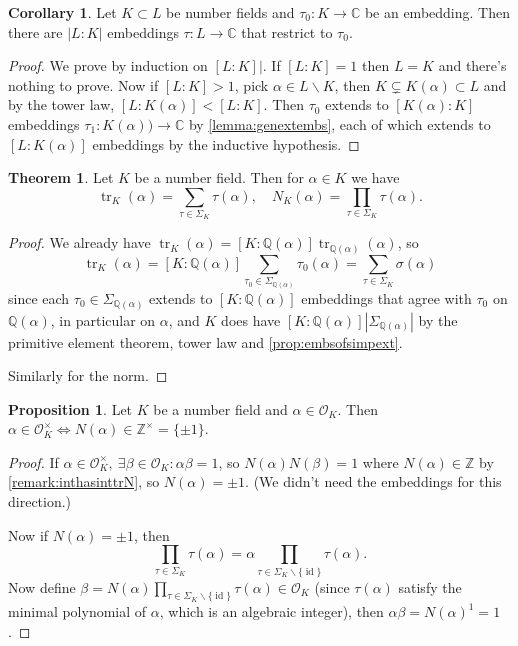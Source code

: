 \documentclass{article}
\newcommand{\Z}{\mathbb{Z}}
\newcommand{\Q}{\mathbb{Q}}
\newcommand{\C}{\mathbb{C}}
\newcommand{\id}{\operatorname{id}}
\newcommand{\tr}{\operatorname{tr}}
\newcommand{\ri}{\mathcal{O}}
\theoremstyle{definition}
\newtheorem{prop}[defn]{Proposition}
\newtheorem{thm}[defn]{Theorem}
\newtheorem{coro}[defn]{Corollary}
\begin{document}
\begin{coro}
Let $K\subset L$ be number fields and $\tau_0:K\rightarrow\C$ be an embedding. Then there are $|L:K|$ embeddings $\tau:L\rightarrow\C$ that restrict to $\tau_0$.
\end{coro}
\begin{proof}
We prove by induction on $[L:K]|$. If $[L:K]=1$ then $L=K$ and there's nothing to prove. Now if $[L:K]>1$, pick $\alpha\in L\backslash K$, then $K\subsetneq K(\alpha)\subset L$ and by the tower law, $[L:K(\alpha)]<[L:K]$. Then $\tau_0$ extends to $[K(\alpha):K]$ embeddings $\tau_1:K(\alpha))\rightarrow\C$ by \ref{lemma:genextembs}, each of which extends to $[L:K(\alpha)]$ embeddings by the inductive hypothesis.
\end{proof}

\begin{thm}
\label{thm:trissumofembandnmisprod}
Let $K$ be a number field. Then for $\alpha\in K$ we have
\[
\tr_K(\alpha)=\sum_{\tau\in\Sigma_K}\tau(\alpha),\quad N_K(\alpha)=\prod_{\tau\in\Sigma_K}\tau(\alpha).
\]
\end{thm}
\begin{proof}
We already have $\tr_K(\alpha)=[K:\Q(\alpha)]\tr_{\Q(\alpha)}(\alpha)$, so
\[
\tr_K(\alpha)=[K:\Q(\alpha)]\sum_{\tau_0\in\Sigma_{\Q(\alpha)}}\tau_0(\alpha)=\sum_{\tau\in\Sigma_K}\sigma(\alpha)
\]
since each $\tau_0\in\Sigma_{\Q(\alpha)}$ extends to $[K:\Q(\alpha)]$ embeddings that agree with $\tau_0$ on $\Q(\alpha)$, in particular on $\alpha$, and $K$ does have $[K:\Q(\alpha)]\left|\Sigma_{\Q(\alpha)}\right|$ by the primitive element theorem, tower law and \ref{prop:embsofsimpext}.

Similarly for the norm.
\end{proof}

\begin{prop}
Let $K$ be a number field and $\alpha\in\ri_K$. Then $\alpha\in\ri_K^\times\iff N(\alpha)\in\Z^\times=\{\pm 1\}$.
\end{prop}
\begin{proof}
If $\alpha\in\ri_K^\times,\ \exists\beta\in\ri_K:\alpha\beta=1$, so $N(\alpha)N(\beta)=1$ where $N(\alpha)\in\Z$ by \ref{remark:inthasinttrN}, so $N(\alpha)=\pm 1$. (We didn't need the embeddings for this direction.)

Now if $N(\alpha)=\pm 1$, then
\[
\prod_{\tau\in\Sigma_K}\tau(\alpha)=\alpha\prod_{\tau\in\Sigma_K\backslash\{\id\}}\tau(\alpha).
\]
Now define $\beta=N(\alpha)\prod_{\tau\in\Sigma_K\backslash\{\id\}}\tau(\alpha)\in\ri_K$ (since $\tau(\alpha)$ satisfy the minimal polynomial of $\alpha$, which is an algebraic integer), then $\alpha\beta=N(\alpha)^1=1$.
\end{proof}
\end{document}
